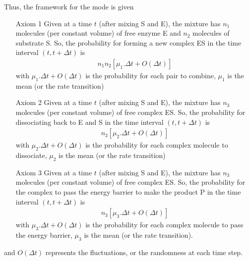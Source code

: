 Thus, the framework for the mode is given
\begin{itemize}
\item [Axiom 1] Given at a time $t$ (after mixing S and E), the
  mixture has $n_1$ molecules (per constant volume) of free enzyme E
  and $n_2$ molecules of substrate S. So, the probability for forming
  a new complex ES in the time interval $(t,t+\Delta t)$ is
  \begin{eqnarray}
    \label{eq:2}
    n_1n_2[\mu_1.\Delta t + O(\Delta t)]
  \end{eqnarray}
  with $\mu_1.\Delta t + O(\Delta t)$ is the probability for each pair
  to combine, $\mu_1$ is the mean (or the rate transition) 
\item [Axiom 2] Given at a time $t$ (after mixing S and E), the
  mixture has $n_3$ molecules (per constant volume) of free complex
  ES. So, the probability for dissociating back to E and S in the time
  interval $(t,t+\Delta t)$ is
  \begin{eqnarray}
    \label{eq:2}
    n_3[\mu_2.\Delta t + O(\Delta t)]
  \end{eqnarray}
  with $\mu_2.\Delta t + O(\Delta t)$ is the probability for each
  complex molecule to dissociate, $\mu_2$ is the mean (or the rate
  transition) 
\item [Axiom 3] Given at a time $t$ (after mixing S and E), the
  mixture has $n_3$ molecules (per constant volume) of free complex
  ES. So, the probability for the complex to pass the energy barrier
  to make the product P in the time interval $(t,t+\Delta t)$ is
  \begin{eqnarray}
    \label{eq:2}
    n_3[\mu_3.\Delta t + O(\Delta t)]
  \end{eqnarray}
  with $\mu_3.\Delta t + O(\Delta t)$ is the probability for each
  complex molecule to pass the energy barrier, $\mu_3$ is the mean (or
  the rate transition).
\end{itemize}
and $O(\Delta t)$ represents the fluctuations, or the randomness at
each time step.

